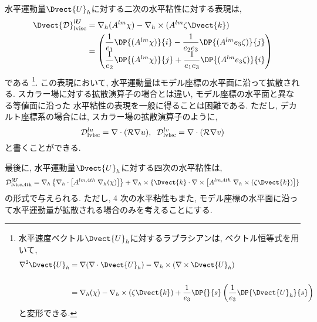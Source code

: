 水平運動量$\Dvect{U}_h$に対する二次の水平粘性に対する表現は, 
\begin{equation*}
\begin{split}
 \Dvect{\mathcal{D}}^{l {\bm U}}_{\rm lvisc}
 &= \nabla_h (A^{lm} \chi) - \nabla_h \times (A^{lm} \zeta \Dvect{k})  \\
 &= 
\begin{pmatrix}
 \dfrac{1}{e_1}\DP{(A^{lm}\chi)}{i} - \dfrac{1}{e_2 e_3}\DP{(A^{lm} e_3 \zeta)}{j} \\
 \dfrac{1}{e_2}\DP{(A^{lm}\chi)}{j} + \dfrac{1}{e_1 e_3}\DP{(A^{lm} e_3 \zeta)}{i}
\end{pmatrix}
\end{split}
\end{equation*}
である
\footnote{
水平速度ベクトル$\Dvect{U}_h$に対するラプラシアンは, ベクトル恒等式を用いて, 
\begin{equation*}
\begin{split}
  \nabla^2 \Dvect{U}_h
 &= \nabla (\nabla \cdot\Dvect{U}_h) -  \nabla_h \times(\nabla \times \Dvect{U}_h)  \\
 & \\
 &=  \nabla_h (\chi) - \nabla_h \times (\zeta\Dvect{k}) + \dfrac{1}{e_3}\DP{}{s}\left(\dfrac{1}{e_3}\DP{\Dvect{U}_h}{s} \right)
\end{split}
\end{equation*}
と変形できる. 
}. 
この表現において, 水平運動量はモデル座標の水平面に沿って拡散される. 
スカラー場に対する拡散演算子の場合とは違い, モデル座標の水平面と異なる等値面に沿った
水平粘性の表現を一般に得ることは困難である. 
ただし, デカルト座標系の場合には, スカラー場の拡散演算子のように, 
\begin{equation*}
  \mathcal{D}^{lu}_{\rm lvisc} = \nabla\cdot(\mathcal{R}\nabla u), \;\;
  \mathcal{D}^{lv}_{\rm lvisc} = \nabla\cdot(\mathcal{R}\nabla v)
\end{equation*}
と書くことができる. 

最後に, 水平運動量$\Dvect{U}_h$に対する四次の水平粘性は, 
\begin{equation*}
  \mathcal{D}^{l{\bm U}}_{\rm lvisc,4th} = 
       \nabla_h \left\{ \nabla_h \cdot \left[ A^{lm,4th} \;  \nabla_h (\chi) \right]\right\}
     + \nabla_h \times \{ \Dvect{k}\cdot\nabla\times\left[A^{lm,4th} \; \nabla_h\times(\zeta \Dvect{k}) \right]  \}
\end{equation*}
の形式で与えられる. 
ただし, 4 次の水平粘性もまた, モデル座標の水平面に沿って水平運動量が拡散される場合のみを考えることにする. 
